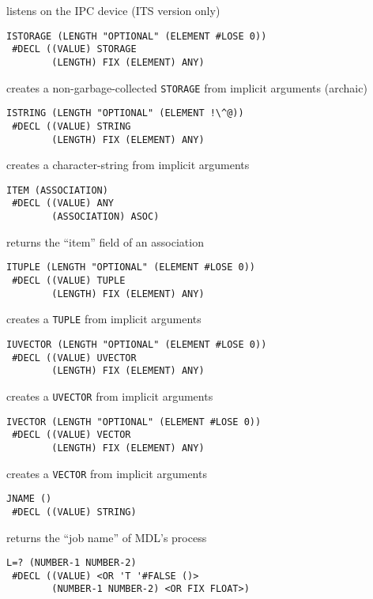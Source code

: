 \documentclass[a4paper]{scrbook}
\begin{document}
listens on the IPC device (ITS version only)

\begin{verbatim}
ISTORAGE (LENGTH "OPTIONAL" (ELEMENT #LOSE 0))
 #DECL ((VALUE) STORAGE
        (LENGTH) FIX (ELEMENT) ANY)
\end{verbatim}

 creates a non-garbage-collected \texttt{STORAGE} from implicit arguments (archaic)

\begin{verbatim}
ISTRING (LENGTH "OPTIONAL" (ELEMENT !\^@))
 #DECL ((VALUE) STRING
        (LENGTH) FIX (ELEMENT) ANY)
\end{verbatim}

creates a character-string from implicit arguments

\begin{verbatim}
ITEM (ASSOCIATION)
 #DECL ((VALUE) ANY
        (ASSOCIATION) ASOC)
\end{verbatim}

returns the ``item'' field of an association

\begin{verbatim}
ITUPLE (LENGTH "OPTIONAL" (ELEMENT #LOSE 0))
 #DECL ((VALUE) TUPLE
        (LENGTH) FIX (ELEMENT) ANY)
\end{verbatim}

creates a \texttt{TUPLE} from implicit arguments

\begin{verbatim}
IUVECTOR (LENGTH "OPTIONAL" (ELEMENT #LOSE 0))
 #DECL ((VALUE) UVECTOR
        (LENGTH) FIX (ELEMENT) ANY)
\end{verbatim}

creates a \texttt{UVECTOR} from implicit arguments

\begin{verbatim}
IVECTOR (LENGTH "OPTIONAL" (ELEMENT #LOSE 0))
 #DECL ((VALUE) VECTOR
        (LENGTH) FIX (ELEMENT) ANY)
\end{verbatim}

creates a \texttt{VECTOR} from implicit arguments

\begin{verbatim}
JNAME ()
 #DECL ((VALUE) STRING)
\end{verbatim}

returns the ``job name'' of MDL's process

\begin{verbatim}
L=? (NUMBER-1 NUMBER-2)
 #DECL ((VALUE) <OR 'T '#FALSE ()>
        (NUMBER-1 NUMBER-2) <OR FIX FLOAT>)
\end{verbatim}
\end{document}
